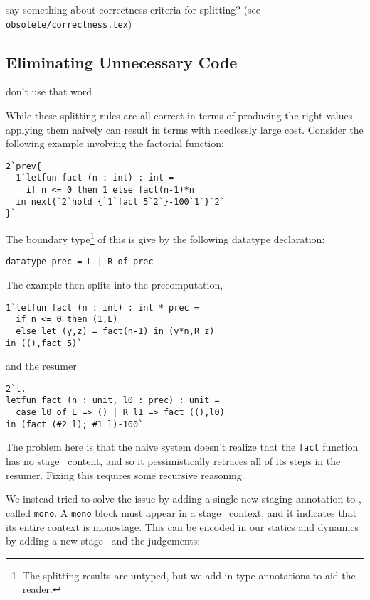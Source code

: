 

\TODO say something about correctness criteria for splitting? (see
\texttt{obsolete/correctness.tex})

\subsection{Eliminating Unnecessary Code}

\TODO don't use that word

While these splitting rules are all correct in terms of producing the right values, applying them naively can result in terms with needlessly large cost.  Consider the following example involving the factorial function:
\begin{lstlisting}
2`prev{
  1`letfun fact (n : int) : int = 
    if n <= 0 then 1 else fact(n-1)*n
  in next{`2`hold {`1`fact 5`2`}-100`1`}`2`
}`
\end{lstlisting}

The boundary type\footnote{The splitting results are untyped, but we add in type annotations to aid the reader.} of this is give by the following datatype declaration:
\begin{lstlisting}
datatype prec = L | R of prec
\end{lstlisting}
The example then splits into the precomputation,
\begin{lstlisting}
1`letfun fact (n : int) : int * prec = 
  if n <= 0 then (1,L) 
  else let (y,z) = fact(n-1) in (y*n,R z)
in ((),fact 5)`
\end{lstlisting}
and the resumer
\begin{lstlisting}
2`l.
letfun fact (n : unit, l0 : prec) : unit = 
  case l0 of L => () | R l1 => fact ((),l0)
in (fact (#2 l); #1 l)-100`
\end{lstlisting}
The problem here is that the naive system doesn't realize that the \texttt{fact} function has no stage \bbtwo\ content,
and so it pessimistically retraces all of its steps in the resumer.  
Fixing this requires some recursive reasoning.  

We instead tried to solve the issue by adding a single new staging annotation to \lang, called \texttt{mono}.  
A \texttt{mono} block must appear in a stage \bbone\ context, and it indicates that its entire context is monostage.
This can be encoded in our statics and dynamics by adding a new stage \bbmono\ and the judgements:

